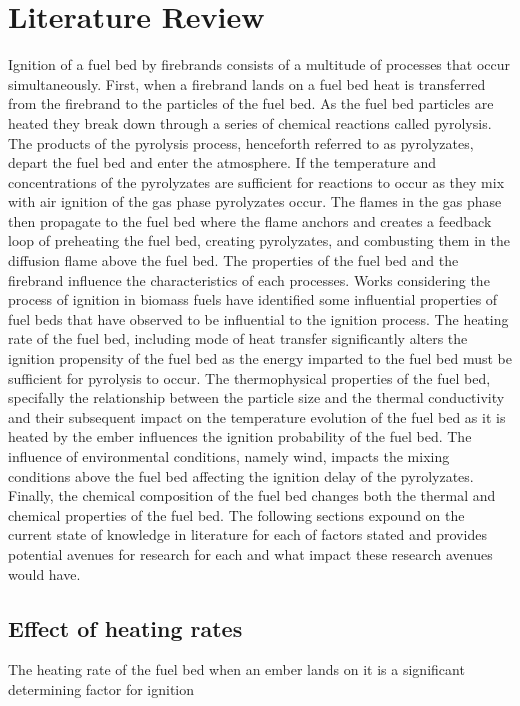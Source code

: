 
\chapter{Literature Review}
\label{part:literature}

    Ignition of a fuel bed by firebrands consists of a multitude of processes that occur simultaneously. First, when a firebrand lands on a fuel bed heat is transferred from the firebrand to the particles of the fuel bed. As the fuel bed particles are heated they break down through a series of chemical reactions called pyrolysis. The products of the pyrolysis process, henceforth referred to as pyrolyzates, depart the fuel bed and enter the atmosphere. If the temperature and concentrations of the pyrolyzates are sufficient for reactions to occur as they mix with air ignition of the gas phase pyrolyzates occur. The flames in the gas phase then propagate to the fuel bed where the flame anchors and creates a feedback loop of preheating the fuel bed, creating pyrolyzates, and combusting them in the diffusion flame above the fuel bed. The properties of the fuel bed and the firebrand influence the characteristics of each processes. Works considering the process of ignition in biomass fuels have identified some influential properties of fuel beds that have observed to be influential to the ignition process. 
    The heating rate of the fuel bed, including mode of heat transfer significantly alters the ignition propensity of the fuel bed as the energy imparted to the fuel bed must be sufficient for pyrolysis to occur. The thermophysical properties of the fuel bed, specifally the relationship between the particle size and the thermal conductivity and their subsequent impact on the temperature evolution of the fuel bed as it is heated by the ember influences the ignition probability of the fuel bed. The influence of environmental conditions, namely wind, impacts the mixing conditions above the fuel bed affecting the ignition delay of the pyrolyzates.  Finally, the chemical composition of the fuel bed changes both the thermal and chemical properties of the fuel bed. The following sections expound on the current state of knowledge in literature for each of factors stated and provides potential avenues for research for each and what impact these research avenues would have.
    
    \section{Effect of heating rates}
        The heating rate of the fuel bed when an ember lands on it is a significant determining factor for ignition 
